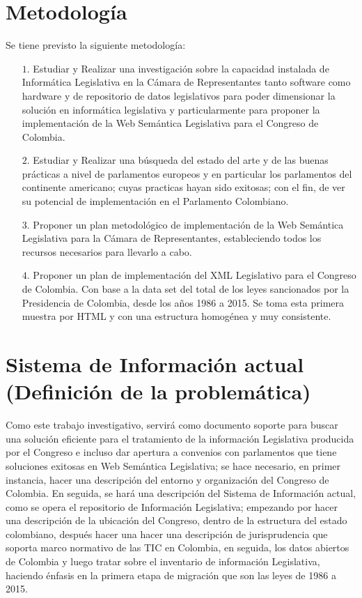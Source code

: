 \documentclass[conference]{IEEEtran}\usepackage[]{graphicx}\usepackage[]{color}
\begin{document}
\section{Metodología}
Se tiene previsto la siguiente metodología:
\begin{itemize}
	\item[$1.$]	Estudiar y Realizar una investigación sobre la capacidad instalada de Informática Legislativa en la Cámara de Representantes tanto software como hardware y de repositorio de datos legislativos para poder dimensionar la solución en informática legislativa y particularmente para proponer  la implementación de la Web Semántica Legislativa para el Congreso de Colombia.\\
	\item[$2.$]	Estudiar y Realizar una búsqueda del estado del arte y de las buenas prácticas a nivel de parlamentos europeos y en particular los parlamentos del continente americano; cuyas practicas hayan sido exitosas; con el fin, de ver su potencial de implementación en el Parlamento Colombiano. \\
	\item[$3.$]	Proponer un plan metodológico de implementación de la Web Semántica Legislativa para la Cámara de Representantes, estableciendo todos los recursos necesarios para llevarlo a cabo.\\
	\item[$4.$] Proponer un plan de implementación del XML Legislativo para el Congreso de Colombia. Con base a la data set del total de los leyes sancionados por la Presidencia de Colombia, desde los años 1986 a 2015. Se toma esta primera muestra por HTML y con una estructura homogénea y muy consistente.
\end{itemize}

\section{Sistema de Información actual (Definición de la problemática)}
Como este trabajo investigativo, servirá como documento soporte para buscar una solución eficiente para el tratamiento de la información Legislativa producida por el Congreso e incluso dar apertura a convenios con parlamentos que tiene soluciones exitosas en Web Semántica Legislativa; se hace necesario, en primer instancia, hacer una descripción del entorno y organización del Congreso de Colombia. En seguida, se hará una descripción del Sistema de Información actual, como se opera el repositorio de Información Legislativa; empezando por hacer una descripción de la ubicación del Congreso, dentro de la estructura del estado colombiano, después hacer una hacer una descripción de jurisprudencia que soporta marco normativo de las TIC en Colombia, en seguida, los datos abiertos de Colombia y luego tratar sobre el inventario de información Legislativa, haciendo énfasis en la primera etapa de migración que son las leyes de 1986 a 2015.
\end{document}
